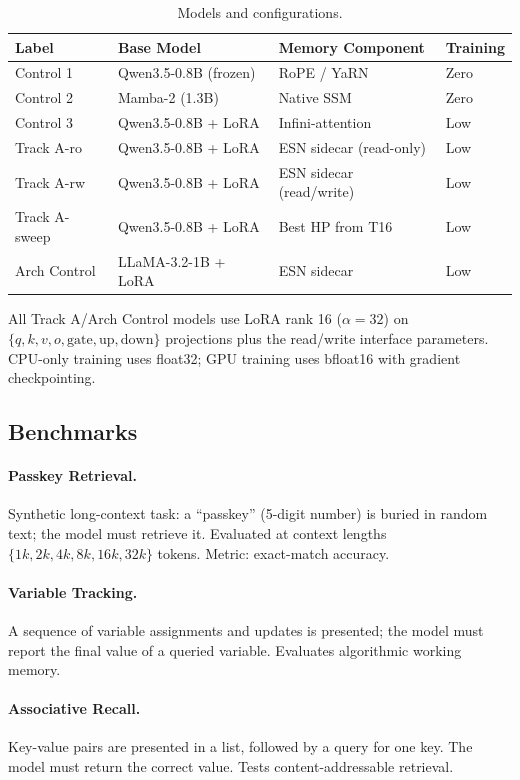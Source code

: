 \documentclass[11pt,a4paper]{article}
\theoremstyle{definition}
\begin{document}
\begin{table}[h]
\centering
\caption{Models and configurations.}
\label{tab:models}
\begin{tabular}{@{}llll@{}}
\toprule
Label & Base Model & Memory Component & Training \\
\midrule
Control 1 & Qwen3.5-0.8B (frozen) & RoPE / YaRN & Zero \\
Control 2 & Mamba-2 (1.3B) & Native SSM & Zero \\
Control 3 & Qwen3.5-0.8B + LoRA & Infini-attention & Low \\
Track A-ro & Qwen3.5-0.8B + LoRA & ESN sidecar (read-only) & Low \\
Track A-rw & Qwen3.5-0.8B + LoRA & ESN sidecar (read/write) & Low \\
Track A-sweep & Qwen3.5-0.8B + LoRA & Best HP from T16 & Low \\
Arch Control & LLaMA-3.2-1B + LoRA & ESN sidecar & Low \\
\bottomrule
\end{tabular}
\end{table}

All Track A/Arch Control models use LoRA rank 16 ($\alpha=32$) on
$\{q, k, v, o, \text{gate}, \text{up}, \text{down}\}$ projections plus
the read/write interface parameters.  CPU-only training uses float32;
GPU training uses bfloat16 with gradient checkpointing.

\subsection{Benchmarks}
\label{sec:benchmarks}

\paragraph{Passkey Retrieval.}
Synthetic long-context task: a ``passkey'' (5-digit number) is buried in
random text; the model must retrieve it.  Evaluated at context lengths
$\{1k, 2k, 4k, 8k, 16k, 32k\}$ tokens.  Metric: exact-match accuracy.

\paragraph{Variable Tracking.}
A sequence of variable assignments and updates is presented; the model must
report the final value of a queried variable.  Evaluates algorithmic
working memory.

\paragraph{Associative Recall.}
Key-value pairs are presented in a list, followed by a query for one key.
The model must return the correct value.  Tests content-addressable retrieval.
\end{document}

